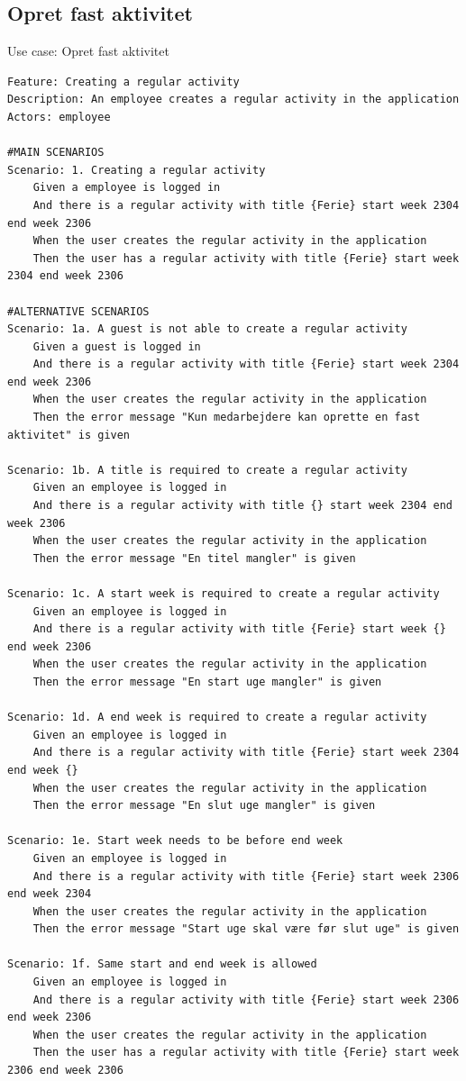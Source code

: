 \subsection{Opret fast aktivitet} 
\begin{listing}[H]
    \centering
    \caption{Use case: Opret fast aktivitet}\label{lst:usecase_regular_activity}
    \begin{verbatim}  
Feature: Creating a regular activity
Description: An employee creates a regular activity in the application
Actors: employee

#MAIN SCENARIOS
Scenario: 1. Creating a regular activity
    Given a employee is logged in
    And there is a regular activity with title {Ferie} start week 2304 end week 2306 
    When the user creates the regular activity in the application 
    Then the user has a regular activity with title {Ferie} start week 2304 end week 2306

#ALTERNATIVE SCENARIOS
Scenario: 1a. A guest is not able to create a regular activity
    Given a guest is logged in
    And there is a regular activity with title {Ferie} start week 2304 end week 2306   
    When the user creates the regular activity in the application 
    Then the error message "Kun medarbejdere kan oprette en fast aktivitet" is given

Scenario: 1b. A title is required to create a regular activity
    Given an employee is logged in
    And there is a regular activity with title {} start week 2304 end week 2306 
    When the user creates the regular activity in the application 
    Then the error message "En titel mangler" is given

Scenario: 1c. A start week is required to create a regular activity
    Given an employee is logged in
    And there is a regular activity with title {Ferie} start week {} end week 2306 
    When the user creates the regular activity in the application 
    Then the error message "En start uge mangler" is given

Scenario: 1d. A end week is required to create a regular activity
    Given an employee is logged in
    And there is a regular activity with title {Ferie} start week 2304 end week {} 
    When the user creates the regular activity in the application 
    Then the error message "En slut uge mangler" is given

Scenario: 1e. Start week needs to be before end week
    Given an employee is logged in
    And there is a regular activity with title {Ferie} start week 2306 end week 2304 
    When the user creates the regular activity in the application 
    Then the error message "Start uge skal være før slut uge" is given

Scenario: 1f. Same start and end week is allowed
    Given an employee is logged in
    And there is a regular activity with title {Ferie} start week 2306 end week 2306 
    When the user creates the regular activity in the application 
    Then the user has a regular activity with title {Ferie} start week 2306 end week 2306

    \end{verbatim}
\end{listing}


